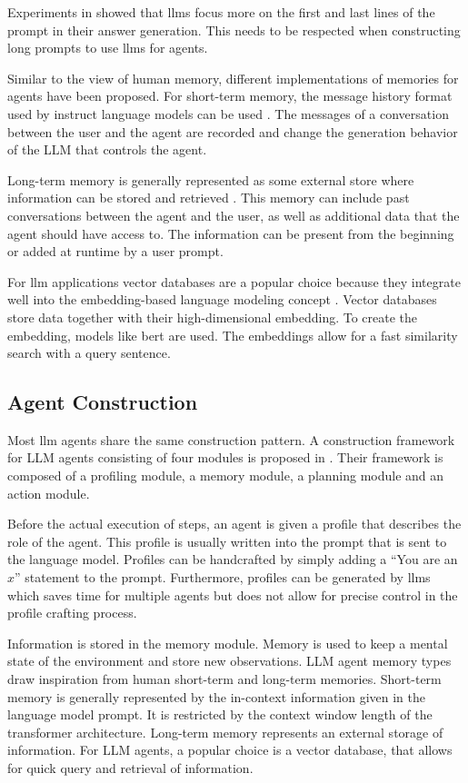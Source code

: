 \documentclass[../main.tex]{subfiles}
\begin{document}
Experiments in \cite{Liu2023} showed
that \glspl{llm} focus more on the first and last lines of the prompt
in their answer generation.
This needs to be respected when constructing long prompts to use \glspl{llm} for agents.

Similar to the view of human memory,
different implementations of memories for agents have been proposed.
For short-term memory,
the message history format used by instruct language models can be used \cite{Hatalis2023}.
The messages of a conversation between the user and the agent
are recorded and change the generation behavior of the LLM that controls the agent.

Long-term memory is generally represented as some external store
where information can be stored and retrieved \cite{Hatalis2023}.
This memory can include past conversations between the agent and the user,
as well as additional data that the agent should have access to.
The information can be present from the beginning or added at runtime by a user prompt.

For \gls{llm} applications vector databases are a popular choice
because they integrate well into the embedding-based language modeling concept \cite{Han2023}.
Vector databases store data together with their high-dimensional embedding.
To create the embedding, models like \gls{bert} are used.
The embeddings allow for a fast similarity search with a query sentence.

\subsection{Agent Construction}

Most \gls{llm} agents share the same construction pattern.
A construction framework for LLM agents consisting of four modules
is proposed in \cite{Wang2023}.
Their framework is composed of a profiling module, a memory module,
a planning module and an action module.

Before the actual execution of steps, an agent is given a profile that describes
the role of the agent.
This profile is usually written into the prompt that is sent to the language model.
Profiles can be handcrafted by simply adding a ``You are an $x$'' statement to the prompt.
Furthermore, profiles can be generated by \glspl{llm} which saves time for multiple agents
but does not allow for precise control in the profile crafting process.

Information is stored in the memory module.
Memory is used to keep a mental state of the environment and store new observations.
LLM agent memory types draw inspiration from human short-term and long-term memories.
Short-term memory is generally represented by the in-context information given in the language model prompt.
It is restricted by the context window length of the transformer architecture.
Long-term memory represents an external storage of information.
For LLM agents, a popular choice is a vector database,
that allows for quick query and retrieval of information.
\end{document}
